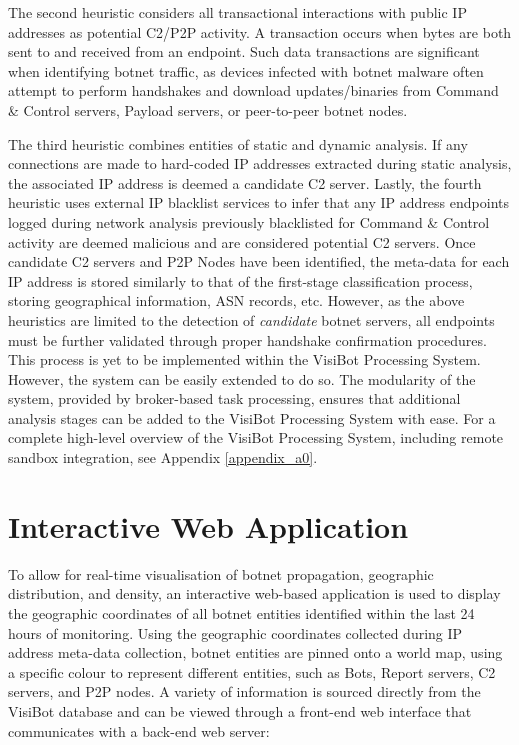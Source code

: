 The second heuristic considers all transactional interactions with public IP addresses as potential C2/P2P activity. A transaction occurs when bytes are both sent to and received from an endpoint. Such data transactions are significant when identifying botnet traffic, as devices infected with botnet malware often attempt to perform handshakes and download updates/binaries from Command \& Control servers, Payload servers, or peer-to-peer botnet nodes.

The third heuristic combines entities of static and dynamic analysis. If any connections are made to hard-coded IP addresses extracted during static analysis, the associated IP address is deemed a candidate C2 server. Lastly, the fourth heuristic uses external IP blacklist services to infer that any IP address endpoints logged during network analysis previously blacklisted for Command \& Control activity are deemed malicious and are considered potential C2 servers. Once candidate C2 servers and P2P Nodes have been identified, the meta-data for each IP address is stored similarly to that of the first-stage classification process, storing geographical information, ASN records, etc. However, as the above heuristics are limited to the detection of \textit{candidate} botnet servers, all endpoints must be further validated through proper handshake confirmation procedures. This process is yet to be implemented within the VisiBot Processing System. However, the system can be easily extended to do so. The modularity of the system, provided by broker-based task processing, ensures that additional analysis stages can be added to the VisiBot Processing System with ease. For a complete high-level overview of the VisiBot Processing System, including remote sandbox integration, see Appendix \ref{appendix_a0}.


\section{Interactive Web Application}

To allow for real-time visualisation of botnet propagation, geographic distribution, and density, an interactive web-based application is used to display the geographic coordinates of all botnet entities identified within the last 24 hours of monitoring. Using the geographic coordinates collected during IP address meta-data collection, botnet entities are pinned onto a world map, using a specific colour to represent different entities, such as Bots, Report servers, C2 servers, and P2P nodes. A variety of information is sourced directly from the VisiBot database and can be viewed through a front-end web interface that communicates with a back-end web server:

